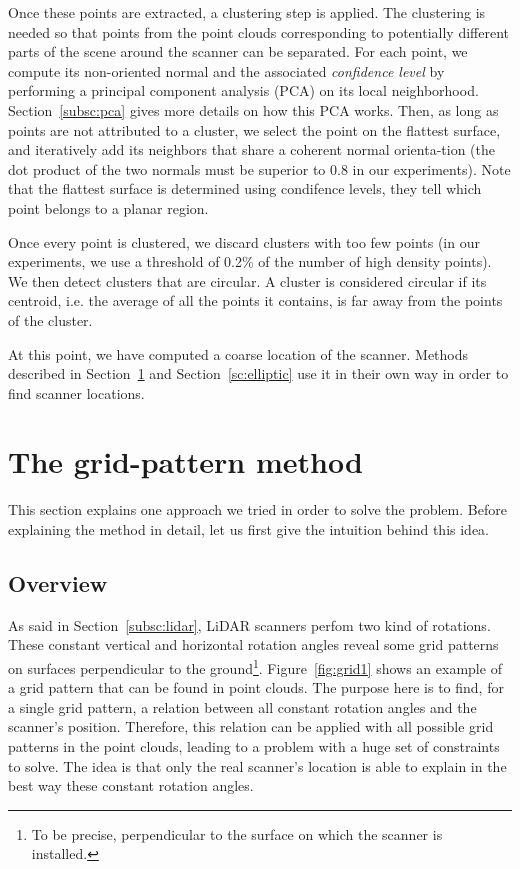 Once these points are extracted, a clustering step is applied. The clustering is needed so that points from the point clouds corresponding to potentially different parts of the scene around the scanner can be separated. For each point, we compute its non-oriented normal and the associated \emph{confidence level} by performing a principal component analysis (PCA) on its local neighborhood. Section~\ref{subsc:pca} gives more details on how this PCA works. Then, as long as points are not attributed
to a cluster, we select the point on the flattest surface, and iteratively add its neighbors that share a coherent normal orienta-tion (the dot product of the two normals must be superior to 0.8 in our experiments). Note that the  flattest surface is determined using condifence levels, they tell which point belongs to a planar region.

Once every point is clustered, we discard clusters with too few points (in our experiments, we use a threshold of 0.2\% of the number of high density points). We then detect clusters that are circular. A cluster is considered circular if its centroid, i.e. the average of all the points it contains, is far away from the points of the cluster.

At this point, we have computed a coarse location of the scanner. Methods described in Section~\ref{sc:grid-pattern} and Section~\ref{sc:elliptic} use it in their own way in order to find scanner locations.



\section{The grid-pattern method}
\label{sc:grid-pattern}
This section explains one approach we tried in order to solve the problem. Before explaining the method in detail, let us first give the intuition behind this idea.

\subsection{Overview}
As said in Section~\ref{subsc:lidar}, LiDAR scanners perfom two kind of rotations. These constant vertical and horizontal rotation angles reveal some grid patterns on surfaces perpendicular to the ground\footnote{To be precise, perpendicular to the surface on which the scanner is installed.}. Figure~\ref{fig:grid1} shows an example of a grid pattern that can be found in point clouds. The purpose here is to find, for a single grid pattern, a relation between all constant rotation angles and the scanner's position. Therefore, this relation can be applied with all possible grid patterns in the point clouds, leading to a problem with a huge set of
constraints to solve. The idea is that only the real scanner's location is able to explain in the best way these constant rotation angles.

